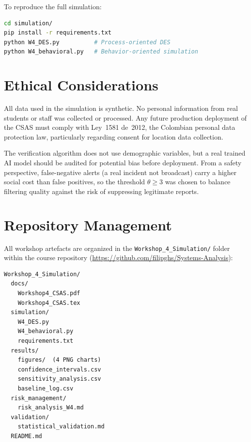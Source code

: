 \documentclass[conference,a4paper,10pt]{IEEEtran}
\begin{document}
To reproduce the full simulation:
\begin{lstlisting}[language=bash, numbers=none]
cd simulation/
pip install -r requirements.txt
python W4_DES.py          # Process-oriented DES
python W4_behavioral.py   # Behavior-oriented simulation
\end{lstlisting}

\section{Ethical Considerations}

All data used in the simulation is synthetic. No personal information
from real students or staff was collected or processed. Any future
production deployment of the CSAS must comply with Ley~1581 de~2012,
the Colombian personal data protection law, particularly regarding
consent for location data collection.

The verification algorithm does not use demographic variables, but
a real trained AI model should be audited for potential bias before
deployment. From a safety perspective, false-negative alerts (a real
incident not broadcast) carry a higher social cost than false
positives, so the threshold $\theta \geq 3$ was chosen to balance
filtering quality against the risk of suppressing legitimate reports.

\section{Repository Management}

All workshop artefacts are organized in the
\texttt{Workshop\_4\_Simulation/} folder within the course repository
(\url{https://github.com/filipghs/Systems-Analysis}):

\begin{small}
\begin{verbatim}
Workshop_4_Simulation/
  docs/
    Workshop4_CSAS.pdf
    Workshop4_CSAS.tex
  simulation/
    W4_DES.py
    W4_behavioral.py
    requirements.txt
  results/
    figures/  (4 PNG charts)
    confidence_intervals.csv
    sensitivity_analysis.csv
    baseline_log.csv
  risk_management/
    risk_analysis_W4.md
  validation/
    statistical_validation.md
  README.md
\end{verbatim}
\end{small}

\end{document}
